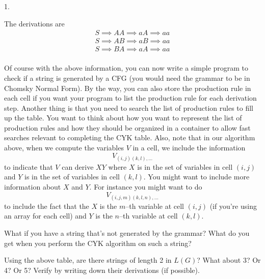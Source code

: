 1. 

The derivations are
\begin{align*}
  S \implies AA \implies aA \implies aa \\
  S \implies AB \implies aB \implies aa \\
  S \implies BA \implies aA \implies aa \\
\end{align*}

\newpage
\begin{ex}
Of course with the above information, you can now
write a simple program to check if a string is generated by a CFG (you
would need the grammar to be in Chomsky Normal Form).
By the way, you can also store the production rule in each cell if you
want your program to list the production rule for each derivation
step. Another thing is that you need to search the list of production 
rules to fill up the table.
You want to think about how you want to represent the list of
production rules and how they should be
organized in a container to allow fast searches relevant to
completing the CYK table.
Also, note that in our algorithm above, when we compute
the variables $V$ in a cell, we include the information
\[
  V_{(i,j)(k,l), ...}
\]
to indicate that $V$ can derive $XY$ where $X$ is in the
set of variables in cell $(i,j)$ and $Y$ is in the set of variables
in cell $(k,l)$.
You might want to include more information about $X$ and $Y$.
For instance you might want to
do
\[
  V_{(i,j,m)(k,l,n), ...}
\]
to include the fact that the $X$ is the $m$--th variable at cell $(i,j)$
(if you're using an array for each cell)
and $Y$ is the $n$--th variable at cell $(k,l)$.
\end{ex}

\newpage
\begin{ex}
What if you have a string that's not generated by the grammar?
What do you get when you perform the CYK algorithm on such a string?
\end{ex}

\newpage
\begin{ex}
Using the above table, are there strings of length 2 in $L(G)$?
What about 3? Or 4? Or 5?
Verify by writing down their derivations (if possible).
\end{ex}


